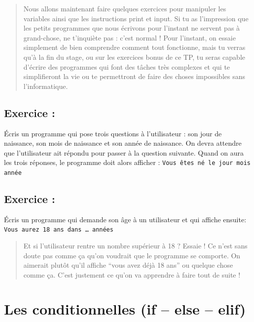 \documentclass[a4paper,french,11pt]{article}
\begin{document}
\begin{quote}
Nous allons maintenant faire quelques exercices pour manipuler les
variables ainsi que les instructions print et input. Si tu as
l'impression que les petits programmes que nous écrivons pour l'instant
ne servent pas à grand-chose, ne t'inquiète pas : c'est normal ! Pour
l'instant, on essaie simplement de bien comprendre comment tout
fonctionne, mais tu verras qu'à la fin du stage, ou sur les exercices
bonus de ce TP, tu seras capable d'écrire des programmes qui font des
tâches très complexes et qui te simplifieront la vie ou te permettront
de faire des choses impossibles sans l'informatique.
\end{quote}

\hypertarget{exercice-4}{%
\subsection{Exercice :}\label{exercice-4}}

Écris un programme qui pose trois questions à l'utilisateur : son jour
de naissance, son mois de naissance et son année de naissance. On devra
attendre que l'utilisateur ait répondu pour passer à la question
suivante. Quand on aura les trois réponses, le programme doit alors
afficher : \texttt{Vous êtes né le jour mois année}

\hypertarget{exercice-5}{%
\subsection{Exercice :}\label{exercice-5}}

Écris un programme qui demande son âge à un utilisateur et qui affiche
ensuite: \texttt{Vous aurez 18 ans dans … années}

\begin{quote}
Et si l'utilisateur rentre un nombre supérieur à 18 ? Essaie ! Ce n'est
sans doute pas comme ça qu'on voudrait que le programme se comporte. On
aimerait plutôt qu'il affiche ``vous avez déjà 18 ans'' ou quelque chose
comme ça. C'est justement ce qu'on va apprendre à faire tout de suite !
\end{quote}

\hypertarget{les-conditionnelles-if-else-elif}{%
\section{Les conditionnelles (if -- else --
elif)}\label{les-conditionnelles-if-else-elif}}
\end{document}
